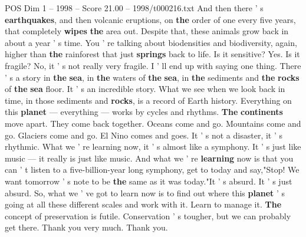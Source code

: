 \begin{textsample}{POS Dim 1 – 1998 – Score 21.00 – 1998/t000216.txt}
And then there ' s \textbf{earthquakes}, and then volcanic eruptions, on \textbf{the} order of one every five years, that completely \textbf{wipes} \textbf{the} area out.
Despite that, these animals grow back in about a year ' s time.
You ' re talking about biodensities and biodiversity, again, higher than \textbf{the} rainforest that just \textbf{springs} back to life.
Is it sensitive?
Yes.
Is it fragile?
No, it ' s not really very fragile.
I ' ll end up with saying one thing.
There ' s a story in \textbf{the} \textbf{sea}, in \textbf{the} waters of \textbf{the} \textbf{sea}, in \textbf{the} sediments and \textbf{the} \textbf{rocks} of \textbf{the} \textbf{sea} floor.
It ' s an incredible story.
What we see when we look back in time, in those sediments and \textbf{rocks}, is a record of Earth history.
Everything on this \textbf{planet} — everything — works by cycles and rhythms. \textbf{The} \textbf{continents} move apart.
They come back together.
Oceans come and go.
Mountains come and go.
Glaciers come and go.
El Nino comes and goes.
It ' s not a disaster, it ' s rhythmic.
What we ' re learning now, it ' s almost like a symphony.
It ' s just like music — it really is just like music.
And what we ' re \textbf{learning} now is that you can ' t listen to a five-billion-year long symphony, get to today and say,"Stop!
We want tomorrow ' s note to be \textbf{the} same as it was today."It ' s absurd.
It ' s just absurd.
So, what we ' ve got to learn now is to find out where this \textbf{planet} ' s going at all these different scales and work with it.
Learn to manage it. \textbf{The} concept of preservation is futile.
Conservation ' s tougher, but we can probably get there.
Thank you very much.
Thank you.

\end{textsample}
